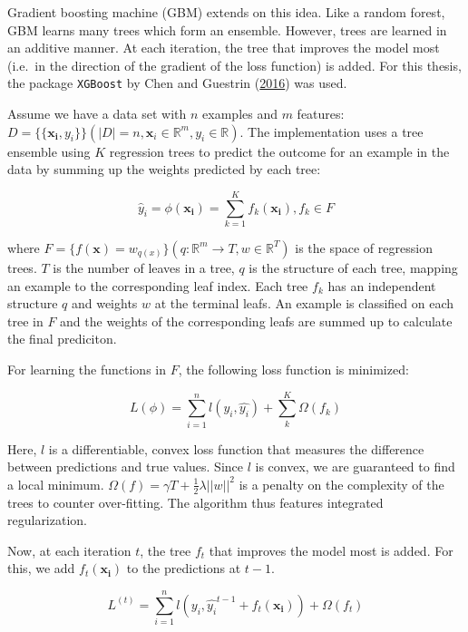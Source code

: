 \documentclass[
  11pt,
  a4paper,
  DIV=12,captions=tableheading,oneside,titlepage=firstiscover,abstracton]{scrreprt}
\begin{document}
Gradient boosting machine (GBM) extends on this idea. Like a random forest, GBM learns many trees which form an ensemble. However, trees are learned in an additive manner. At each iteration, the tree that improves the model most (i.e.~in the direction of the gradient of the loss function) is added. For this thesis, the package \texttt{XGBoost} by Chen and Guestrin (\protect\hyperlink{ref-chen2016xgboost}{2016}) was used.

Assume we have a data set with \(n\) examples and \(m\) features: \(D = \{\{\mathbf{x_i}, y_i\}\} ( |D| = n, \mathbf{x}_i \in \mathbb{R}^m, y_i \in \mathbb{R})\). The implementation uses a tree ensemble using \(K\) regression trees to predict the outcome for an example in the data by summing up the weights predicted by each tree:

\begin{equation}
\hat{y}_i = \phi(\mathbf{x_i}) = \sum_{k=1}^K f_k(\mathbf{x_i}), f_k \in F
\label{eq:gbm-ensemble}
\end{equation}

where \(F = \{f(\mathbf{x}) = w_{q(x)}\} (q: \mathbb{R}^m \rightarrow T, w \in \mathbb{R}^T)\) is the space of regression trees. \(T\) is the number of leaves in a tree, \(q\) is the structure of each tree, mapping an example to the corresponding leaf index. Each tree \(f_k\) has an independent structure \(q\) and weights \(w\) at the terminal leafs. An example is classified on each tree in \(F\) and the weights of the corresponding leafs are summed up to calculate the final prediciton.

For learning the functions in \(F\), the following loss function is minimized:

\begin{equation}
L(\phi) = \sum_{i=1}^n l(y_i, \hat{y_i}) + \sum_k^K \Omega(f_k)
\label{eq:gbm-loss}
\end{equation}

Here, \(l\) is a differentiable, convex loss function that measures the difference between predictions and true values. Since \(l\) is convex, we are guaranteed to find a local minimum. \(\Omega(f) = \gamma T + \frac{1}{2}\lambda||w||^2\) is a penalty on the complexity of the trees to counter over-fitting. The algorithm thus features integrated regularization.

Now, at each iteration \(t\), the tree \(f_t\) that improves the model most is added. For this, we add \(f_t(\mathbf{x_i})\) to the predictions at \(t-1\).

\begin{equation}
L^{(t)} = \sum_{i=1}^n l(y_i, \hat{y_i}^{t-1} + f_t(\mathbf{x_i})) +\Omega(f_t)
\label{eq:gbm-iterate}
\end{equation}
\end{document}
